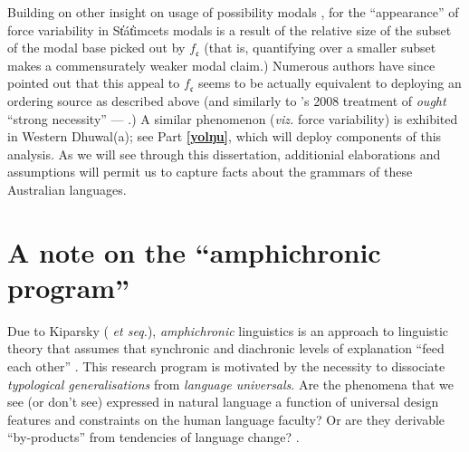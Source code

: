 \documentclass[12pt,dvipsnames]{report}
\begin{document}
Building on other insight on usage of possibility modals \citep[notably][]{Klinedinst2007}, for \citet{Rullmann2008} the ``appearance'' of force variability in St̓át̓imcets modals is a result of the relative size of the subset of the modal base picked out by $ f_{\mathfrak c} $ (that is, quantifying over a smaller subset makes a commensurately weaker modal claim.) Numerous authors have since pointed out that this appeal to $ f_{\mathfrak c} $ seems to be actually equivalent to deploying an ordering source as described above (and similarly to \citeauthor{VonFintel2008}'s 2008 treatment of \textit{ought} ``strong necessity'' --- \citealp[see][]{Portner2009,Matthewson2010,Peterson2008}.)
 A similar phenomenon (\textit{viz.} force variability) is exhibited in Western Dhuwal(a); see Part \textbf{\ref{yolŋu}}, which will deploy components of this analysis. As we will see through this dissertation, additionial elaborations and assumptions will permit us to capture facts about the grammars of these Australian languages.

\section{A note on the ``amphichronic program''}\label{amph}

Due to Kiparsky (\citeyear{Kiparsky2006} \textit{et seq.}), \textit{amphichronic} linguistics is an approach to linguistic theory that assumes that synchronic and diachronic levels of explanation ``feed each other'' \citep[see also][]{Bermudez-Otero2013}. This research program is motivated by the necessity to dissociate \textit{typological generalisations} from \textit{language universals}. Are the phenomena that we see (or don't see) expressed in natural language a function of universal design features and constraints on the human language faculty? Or are they derivable ``by-products'' from tendencies of language change? \citep[see also][]{Anderson2008,Anderson2016a}.
\end{document}
